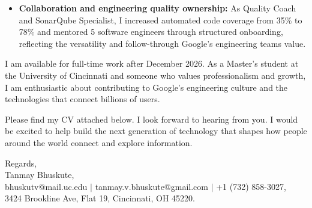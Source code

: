 \documentclass[11pt]{letter}
\begin{document}
\begin{letter}{}
\begin{itemize}[leftmargin=*, itemsep=0.45em]
    \item \textbf{Collaboration and engineering quality ownership:} As Quality Coach and SonarQube Specialist, I increased automated code coverage from 35\% to 78\% and mentored 5 software engineers through structured onboarding, reflecting the versatility and follow-through Google's engineering teams value.
\end{itemize}

I am available for full-time work after December 2026. As a Master's student at the University of Cincinnati and someone who values professionalism and growth, I am enthusiastic about contributing to Google's engineering culture and the technologies that connect billions of users.

Please find my CV attached below. I look forward to hearing from you. I would be excited to help build the next generation of technology that shapes how people around the world connect and explore information.

{\setlength{\parskip}{0pt}
Regards,\\
Tanmay Bhuskute,\\
bhuskutv@mail.uc.edu $\mid$ tanmay.v.bhuskute@gmail.com $\mid$ +1 (732) 858-3027,\\
3424 Brookline Ave, Flat 19, Cincinnati, OH 45220.
}

\end{letter}
\end{document}
